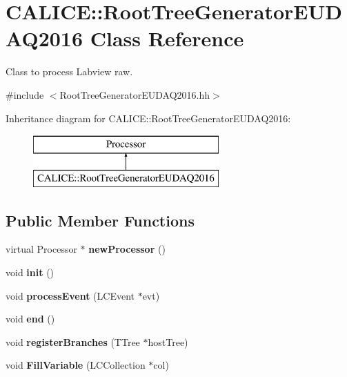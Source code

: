 \section{C\-A\-L\-I\-C\-E\-:\-:Root\-Tree\-Generator\-E\-U\-D\-A\-Q2016 Class Reference}
\label{classCALICE_1_1RootTreeGeneratorEUDAQ2016}


Class to process Labview raw.  




{\ttfamily \#include $<$Root\-Tree\-Generator\-E\-U\-D\-A\-Q2016.\-hh$>$}

Inheritance diagram for C\-A\-L\-I\-C\-E\-:\-:Root\-Tree\-Generator\-E\-U\-D\-A\-Q2016\-:\begin{figure}[H]
\begin{center}
\leavevmode
\includegraphics[height=2.000000cm]{classCALICE_1_1RootTreeGeneratorEUDAQ2016}
\end{center}
\end{figure}
\subsection*{Public Member Functions}
\begin{DoxyCompactItemize}
\item 
virtual Processor $\ast$ {\bfseries new\-Processor} ()\label{classCALICE_1_1RootTreeGeneratorEUDAQ2016_adb6517ac6d1e813d05d19d0a118caa8c}

\item 
void {\bfseries init} ()\label{classCALICE_1_1RootTreeGeneratorEUDAQ2016_a2eb9c18fbb3422bd9a6800565f4c9d07}

\item 
void {\bfseries process\-Event} (L\-C\-Event $\ast$evt)\label{classCALICE_1_1RootTreeGeneratorEUDAQ2016_a5d169a6cdf7f3471a2a150dd4723f377}

\item 
void {\bfseries end} ()\label{classCALICE_1_1RootTreeGeneratorEUDAQ2016_acc5e873edc240b1789ba394087e2c26e}

\item 
void {\bfseries register\-Branches} (T\-Tree $\ast$host\-Tree)\label{classCALICE_1_1RootTreeGeneratorEUDAQ2016_a56d658a01150d2c00b4a5c37807f17bf}

\item 
void {\bfseries Fill\-Variable} (L\-C\-Collection $\ast$col)\label{classCALICE_1_1RootTreeGeneratorEUDAQ2016_ae758d4492e1ec6e7dc180476294e0754}

\end{DoxyCompactItemize}
